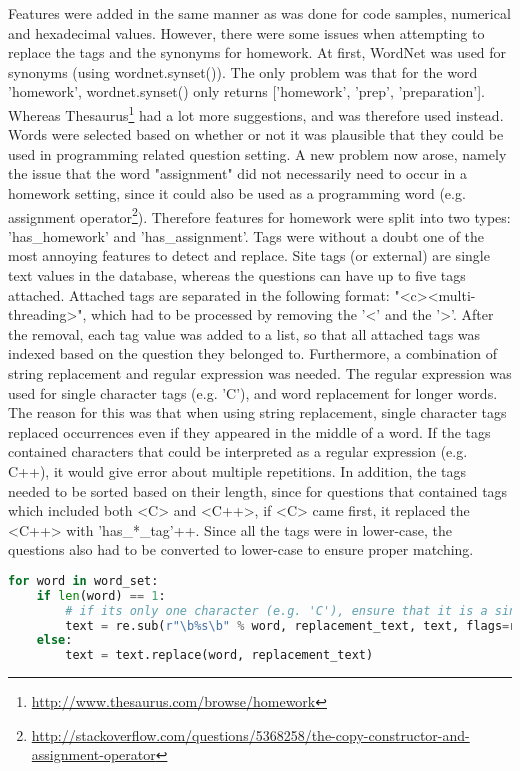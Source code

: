 \vspace{0.5em}\newline
Features were added in the same manner as was done for code samples, numerical and hexadecimal values. 
However, there were some issues when attempting to replace the tags and the synonyms for homework.
At first, WordNet was used for synonyms (using wordnet.synset()). 
The only problem was that for the word 'homework', wordnet.synset() only returns ['homework', 'prep', 'preparation'].
Whereas Thesaurus\footnote{\url{http://www.thesaurus.com/browse/homework}} had a lot more suggestions, and was therefore used instead.
Words were selected based on whether or not it was plausible that they could be used in programming related question setting.
A new problem now arose, namely the issue that the word "assignment" did not necessarily need to occur in a homework setting, since it could also be used as a programming word
(e.g. assignment operator\footnote{\url{http://stackoverflow.com/questions/5368258/the-copy-constructor-and-assignment-operator}}).
Therefore features for homework were split into two types: 'has\_homework' and 'has\_assignment'.
\vspace{0.5em}\newline
Tags were without a doubt one of the most annoying features to detect and replace. 
Site tags (or external) are single text values in the database, whereas the questions can have up to five tags attached. 
Attached tags are separated in the following format: "<c><multi-threading>", which had to be processed by removing the '<' and the '>'.
After the removal, each tag value was added to a list, so that all attached tags was indexed based on the question they belonged to. 
Furthermore, a combination of string replacement and regular expression was needed. 
The regular expression was used for single character tags (e.g. 'C'), and word replacement for longer words.
The reason for this was that when using string replacement, single character tags replaced occurrences even if they appeared in the middle of a word.
If the tags contained characters that could be interpreted as a regular expression (e.g. C++), it would give error about multiple repetitions.
In addition, the tags needed to be sorted based on their length, since for questions that contained tags which included both <C> and <C++>, 
if <C> came first, it replaced the <C++> with 'has\_*\_tag'++. 
Since all the tags were in lower-case, the questions also had to be converted to lower-case to ensure proper matching.

\begin{lstlisting}[caption={Replacing tags in the question}, 
label={lst:pandas_categorical}, language={Python}, basicstyle=\small] 
for word in word_set:
	if len(word) == 1:
		# if its only one character (e.g. 'C'), ensure that it is a singular word by using regex
		text = re.sub(r"\b%s\b" % word, replacement_text, text, flags=re.IGNORECASE)
	else:
		text = text.replace(word, replacement_text)
\end{lstlisting}

